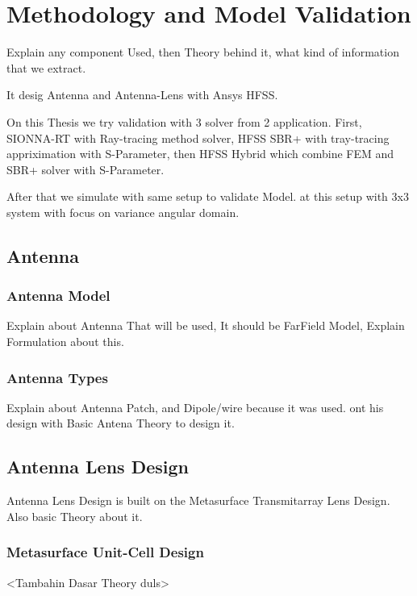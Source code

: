 \chapter{Methodology and Model Validation}
Explain any component Used, then Theory behind it, what kind of information that we extract.

It desig Antenna and Antenna-Lens with Ansys HFSS.

On this Thesis we try validation with 3 solver from 2 application. First, SIONNA-RT with Ray-tracing method solver, HFSS SBR+ with tray-tracing appriximation with S-Parameter, then HFSS Hybrid which combine FEM and SBR+ solver with S-Parameter. 

After that we simulate with same setup to validate Model. at this setup with 3x3 system with focus on variance angular domain.

\section{Antenna}
\subsection{Antenna Model}
Explain about Antenna That will be used, It should be FarField Model, Explain Formulation about this.

\subsection{Antenna Types}
Explain about Antenna Patch, and Dipole/wire because it was used. ont his design with Basic Antena Theory to design it.


\section{Antenna Lens Design}
Antenna Lens Design is built on the Metasurface Transmitarray Lens Design. Also basic Theory about it.

\subsection{Metasurface Unit-Cell Design}
<Tambahin Dasar Theory duls>

